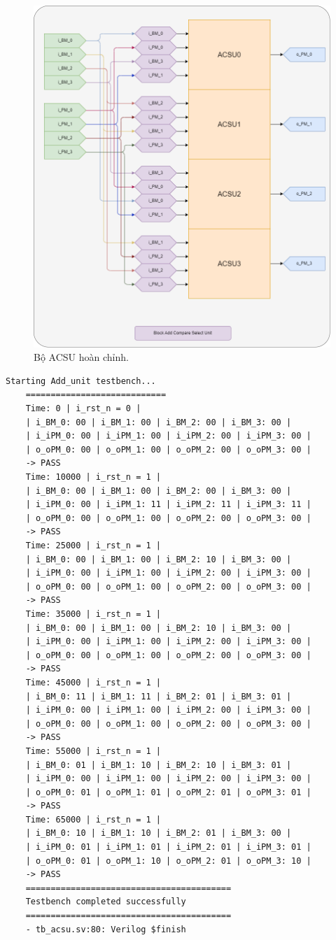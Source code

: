 \begin{figure}[H]
	\centering
	\includegraphics[width=.8\linewidth]{sections/pic/mophongbangSystemVerilog/ACSU.png}
	\caption{Bộ ACSU hoàn chỉnh.}
\end{figure}

\begin{lstlisting}[style=StyleResult, language=Result]
	Starting Add_unit testbench...
	============================
	Time: 0 | i_rst_n = 0 | 
	| i_BM_0: 00 | i_BM_1: 00 | i_BM_2: 00 | i_BM_3: 00 |
	| i_iPM_0: 00 | i_iPM_1: 00 | i_iPM_2: 00 | i_iPM_3: 00 |
	| o_oPM_0: 00 | o_oPM_1: 00 | o_oPM_2: 00 | o_oPM_3: 00 |
	-> PASS
	Time: 10000 | i_rst_n = 1 | 
	| i_BM_0: 00 | i_BM_1: 00 | i_BM_2: 00 | i_BM_3: 00 |
	| i_iPM_0: 00 | i_iPM_1: 11 | i_iPM_2: 11 | i_iPM_3: 11 |
	| o_oPM_0: 00 | o_oPM_1: 00 | o_oPM_2: 00 | o_oPM_3: 00 |
	-> PASS
	Time: 25000 | i_rst_n = 1 | 
	| i_BM_0: 00 | i_BM_1: 00 | i_BM_2: 10 | i_BM_3: 00 |
	| i_iPM_0: 00 | i_iPM_1: 00 | i_iPM_2: 00 | i_iPM_3: 00 |
	| o_oPM_0: 00 | o_oPM_1: 00 | o_oPM_2: 00 | o_oPM_3: 00 |
	-> PASS
	Time: 35000 | i_rst_n = 1 | 
	| i_BM_0: 00 | i_BM_1: 00 | i_BM_2: 10 | i_BM_3: 00 |
	| i_iPM_0: 00 | i_iPM_1: 00 | i_iPM_2: 00 | i_iPM_3: 00 |
	| o_oPM_0: 00 | o_oPM_1: 00 | o_oPM_2: 00 | o_oPM_3: 00 |
	-> PASS
	Time: 45000 | i_rst_n = 1 | 
	| i_BM_0: 11 | i_BM_1: 11 | i_BM_2: 01 | i_BM_3: 01 |
	| i_iPM_0: 00 | i_iPM_1: 00 | i_iPM_2: 00 | i_iPM_3: 00 |
	| o_oPM_0: 00 | o_oPM_1: 00 | o_oPM_2: 00 | o_oPM_3: 00 |
	-> PASS
	Time: 55000 | i_rst_n = 1 | 
	| i_BM_0: 01 | i_BM_1: 10 | i_BM_2: 10 | i_BM_3: 01 |
	| i_iPM_0: 00 | i_iPM_1: 00 | i_iPM_2: 00 | i_iPM_3: 00 |
	| o_oPM_0: 01 | o_oPM_1: 01 | o_oPM_2: 01 | o_oPM_3: 01 |
	-> PASS
	Time: 65000 | i_rst_n = 1 | 
	| i_BM_0: 10 | i_BM_1: 10 | i_BM_2: 01 | i_BM_3: 00 |
	| i_iPM_0: 01 | i_iPM_1: 01 | i_iPM_2: 01 | i_iPM_3: 01 |
	| o_oPM_0: 01 | o_oPM_1: 10 | o_oPM_2: 01 | o_oPM_3: 10 |
	-> PASS
	=========================================
	Testbench completed successfully
	=========================================
	- tb_acsu.sv:80: Verilog $finish
\end{lstlisting}

